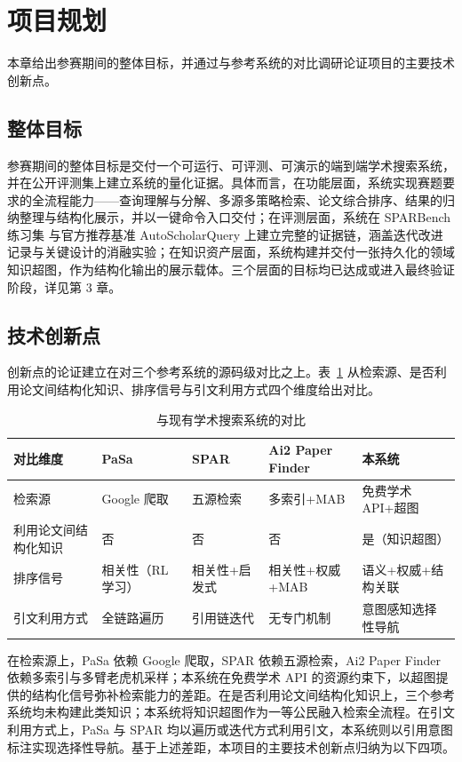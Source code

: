 \documentclass[12pt,a4paper]{ctexart}
\begin{document}
\section{项目规划}

本章给出参赛期间的整体目标，并通过与参考系统的对比调研论证项目的主要技术创新点。

\subsection{整体目标}

参赛期间的整体目标是交付一个可运行、可评测、可演示的端到端学术搜索系统，并在公开评测集上建立系统的量化证据。具体而言，在功能层面，系统实现赛题要求的全流程能力——查询理解与分解、多源多策略检索、论文综合排序、结果的归纳整理与结构化展示，并以一键命令入口交付；在评测层面，系统在 SPARBench 练习集\cite{sparbench} 与官方推荐基准 AutoScholarQuery 上建立完整的证据链，涵盖迭代改进记录与关键设计的消融实验；在知识资产层面，系统构建并交付一张持久化的领域知识超图，作为结构化输出的展示载体。三个层面的目标均已达成或进入最终验证阶段，详见第 3 章。

\subsection{技术创新点}

创新点的论证建立在对三个参考系统的源码级对比之上。表~\ref{tab:cmp} 从检索源、是否利用论文间结构化知识、排序信号与引文利用方式四个维度给出对比。

\begin{table}[htbp]
\centering
\small
\caption{与现有学术搜索系统的对比}
\label{tab:cmp}
\begin{tabularx}{\textwidth}{>{\raggedright\arraybackslash}p{2.6cm} X X X X}
\toprule
对比维度 & PaSa & SPAR & Ai2 Paper Finder & 本系统 \tabularnewline
\midrule
检索源 & Google 爬取 & 五源检索 & 多索引+MAB & 免费学术 API+超图 \tabularnewline
利用论文间结构化知识 & 否 & 否 & 否 & 是（知识超图） \tabularnewline
排序信号 & 相关性（RL 学习） & 相关性+启发式 & 相关性+权威+MAB & 语义+权威+结构关联 \tabularnewline
引文利用方式 & 全链路遍历 & 引用链迭代 & 无专门机制 & 意图感知选择性导航 \tabularnewline
\bottomrule
\end{tabularx}
\end{table}

在检索源上，PaSa 依赖 Google 爬取，SPAR 依赖五源检索，Ai2 Paper Finder 依赖多索引与多臂老虎机采样；本系统在免费学术 API 的资源约束下，以超图提供的结构化信号弥补检索能力的差距。在是否利用论文间结构化知识上，三个参考系统均未构建此类知识；本系统将知识超图作为一等公民融入检索全流程。在引文利用方式上，PaSa 与 SPAR 均以遍历或迭代方式利用引文，本系统则以引用意图标注实现选择性导航。基于上述差距，本项目的主要技术创新点归纳为以下四项。
\end{document}
